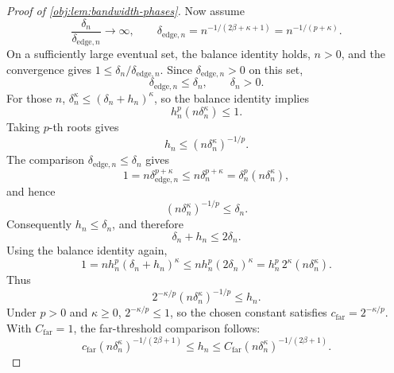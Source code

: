 \begin{proof}[Proof of \cref{obj:lem:bandwidth-phases}]
Now assume
\[
\frac{\delta_n}{\delta_{\mathrm{edge},n}}\to\infty,
\qquad
\delta_{\mathrm{edge},n}=n^{-1/(2\beta+\kappa+1)}=n^{-1/(p+\kappa)}.
\]
On a sufficiently large eventual set, the balance identity holds, \(n>0\), and the convergence gives \(1\le\delta_n/\delta_{\mathrm{edge},n}\). Since \(\delta_{\mathrm{edge},n}>0\) on this set,
\[
\delta_{\mathrm{edge},n}\le\delta_n,
\qquad
\delta_n>0.
\]
For those \(n\), \(\delta_n^\kappa\le(\delta_n+h_n)^\kappa\), so the balance identity implies
\[
h_n^p(n\delta_n^\kappa)\le1.
\]
Taking \(p\)-th roots gives
\[
h_n\le (n\delta_n^\kappa)^{-1/p} .
\]
The comparison \(\delta_{\mathrm{edge},n}\le\delta_n\) gives
\[
1=n\delta_{\mathrm{edge},n}^{p+\kappa}
\le n\delta_n^{p+\kappa}
=\delta_n^p(n\delta_n^\kappa),
\]
and hence
\[
(n\delta_n^\kappa)^{-1/p}\le\delta_n .
\]
Consequently \(h_n\le\delta_n\), and therefore
\[
\delta_n+h_n\le2\delta_n .
\]
Using the balance identity again,
\[
1
=
n h_n^p(\delta_n+h_n)^\kappa
\le
n h_n^p(2\delta_n)^\kappa
=
h_n^p\,2^\kappa(n\delta_n^\kappa).
\]
Thus
\[
2^{-\kappa/p}(n\delta_n^\kappa)^{-1/p}\le h_n .
\]
Under \(p>0\) and \(\kappa\ge0\), \(2^{-\kappa/p}\le1\), so the chosen constant satisfies \(c_{\mathrm{far}}=2^{-\kappa/p}\). With \(C_{\mathrm{far}}=1\), the far-threshold comparison follows:
\[
c_{\mathrm{far}}(n\delta_n^\kappa)^{-1/(2\beta+1)}
\le
h_n
\le
C_{\mathrm{far}}(n\delta_n^\kappa)^{-1/(2\beta+1)} .
\]


\end{proof}

